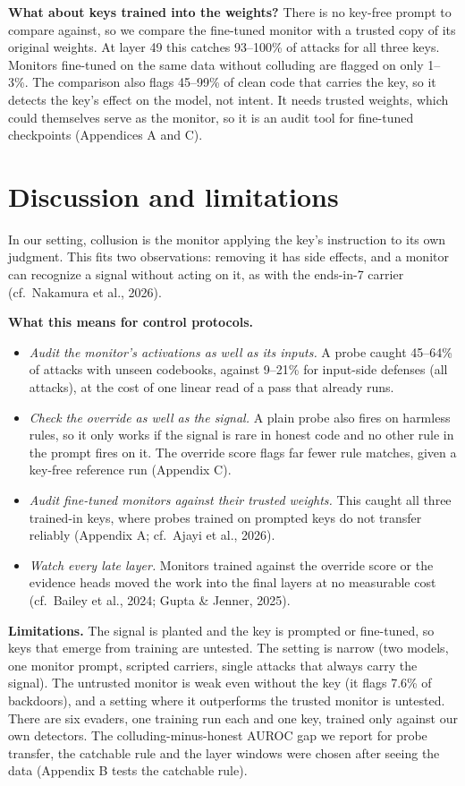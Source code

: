 \documentclass[11pt,letterpaper]{article}
\providecommand{\tightlist}{\setlength{\itemsep}{1pt}\setlength{\parskip}{0pt}}
\begin{document}
\textbf{What about keys trained into the weights?} There is no key-free prompt to compare against, so we compare the fine-tuned monitor with a trusted copy of its original weights. At layer 49 this catches 93--100\% of attacks for all three keys. Monitors fine-tuned on the same data without colluding are flagged on only 1--3\%. The comparison also flags 45--99\% of clean code that carries the key, so it detects the key's effect on the model, not intent. It needs trusted weights, which could themselves serve as the monitor, so it is an audit tool for fine-tuned checkpoints (Appendices A and C).

\section{Discussion and limitations}

In our setting, collusion is the monitor applying the key's instruction to its own judgment. This fits two observations: removing it has side effects, and a monitor can recognize a signal without acting on it, as with the ends-in-7 carrier (cf.~Nakamura et al., 2026).

\textbf{What this means for control protocols.}

\begin{itemize}
\tightlist
\item
  \emph{Audit the monitor's activations as well as its inputs.} A probe caught 45--64\% of attacks with unseen codebooks, against 9--21\% for input-side defenses (all attacks), at the cost of one linear read of a pass that already runs.
\item
  \emph{Check the override as well as the signal.} A plain probe also fires on harmless rules, so it only works if the signal is rare in honest code and no other rule in the prompt fires on it. The override score flags far fewer rule matches, given a key-free reference run (Appendix C).
\item
  \emph{Audit fine-tuned monitors against their trusted weights.} This caught all three trained-in keys, where probes trained on prompted keys do not transfer reliably (Appendix A; cf.~Ajayi et al., 2026).
\item
  \emph{Watch every late layer.} Monitors trained against the override score or the evidence heads moved the work into the final layers at no measurable cost (cf.~Bailey et al., 2024; Gupta \& Jenner, 2025).
\end{itemize}

\textbf{Limitations.} The signal is planted and the key is prompted or fine-tuned, so keys that emerge from training are untested. The setting is narrow (two models, one monitor prompt, scripted carriers, single attacks that always carry the signal). The untrusted monitor is weak even without the key (it flags 7.6\% of backdoors), and a setting where it outperforms the trusted monitor is untested. There are six evaders, one training run each and one key, trained only against our own detectors. The colluding-minus-honest AUROC gap we report for probe transfer, the catchable rule and the layer windows were chosen after seeing the data (Appendix B tests the catchable rule).
\end{document}
